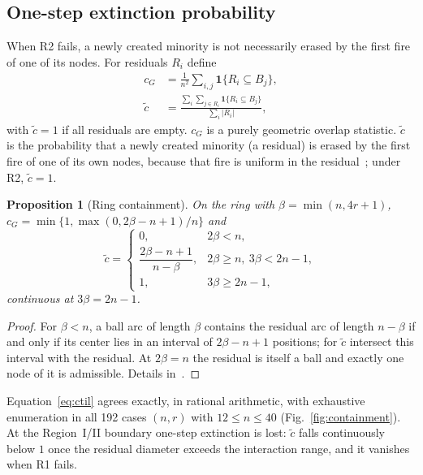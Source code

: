 \documentclass[aps,pre,reprint,superscriptaddress,amsmath,amssymb,longbibliography]{revtex4-2}
\newtheorem{proposition}{Proposition}
\theoremstyle{remark}
\newcommand{\ctil}{\tilde c}
\newcommand{\cG}{c_G}
\begin{document}
\subsection{One-step extinction probability}

When R2 fails, a newly created minority is not necessarily erased by
the first fire of one of its nodes. For residuals $R_i$ define
\begin{align}
\cG&=\frac{1}{n^2}\sum_{i,j}\mathbf 1\{R_i\subseteq B_j\},\label{eq:cG}\\
\ctil&=\frac{\sum_i\sum_{j\in R_i}\mathbf 1\{R_i\subseteq B_j\}}{\sum_i|R_i|},
\label{eq:containment}
\end{align}
with $\ctil=1$ if all residuals are empty. $\cG$ is a purely geometric
overlap statistic. $\ctil$ is the probability that a newly created
minority (a residual) is erased by the first fire of one of its own
nodes, because that fire is uniform in the residual~\cite{SM}; under R2,
$\ctil=1$.

\begin{proposition}[Ring containment]
\label{prop:ring}
On the ring with $\beta=\min(n,4r+1)$,
$\cG=\min\{1,\max(0,2\beta-n+1)/n\}$ and
\begin{equation}
\ctil=
\begin{cases}
0, & 2\beta<n,\\
\dfrac{2\beta-n+1}{n-\beta}, & 2\beta\ge n,\ 3\beta<2n-1,\\[6pt]
1, & 3\beta\ge2n-1,
\end{cases}
\label{eq:ctil}
\end{equation}
continuous at $3\beta=2n-1$.
\end{proposition}

\begin{proof}
For $\beta<n$, a ball arc of length $\beta$ contains the residual arc of
length $n-\beta$ if and only if its center lies in an interval of
$2\beta-n+1$ positions; for $\ctil$ intersect this interval with the
residual. At $2\beta=n$ the residual is itself a ball and exactly one
node of it is admissible. Details in~\cite{SM}.
\end{proof}

Equation~\eqref{eq:ctil} agrees exactly, in rational arithmetic, with
exhaustive enumeration in all 192 cases $(n,r)$ with $12\le n\le40$
(Fig.~\ref{fig:containment}). At the Region~I/II boundary one-step extinction is lost: $\ctil$ falls
continuously below $1$ once the residual diameter exceeds the
interaction range, and it vanishes when R1 fails.
\end{document}
